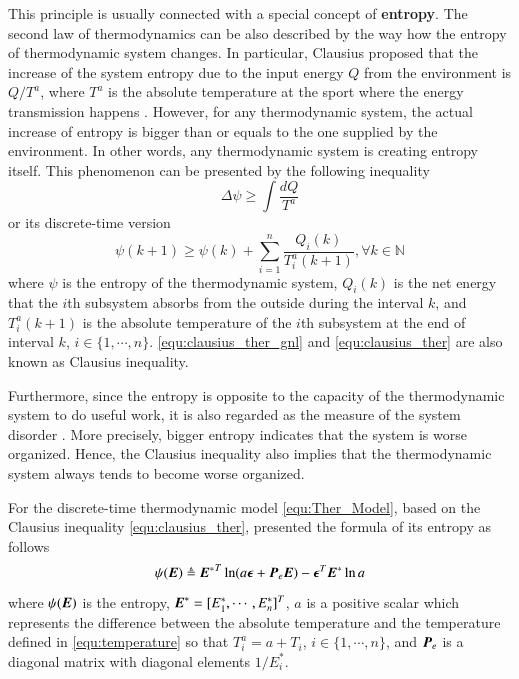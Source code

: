 \documentclass[preprint,authoryear,12pt]{elsarticle}
\renewcommand{\vec}[1]{\mbox{\boldmath$#1$}}
\newcommand{\mat}[1]{\mbox{\boldmath$#1$}}
\begin{document}
This principle is usually connected with a special concept of \textbf{entropy}. The second law of thermodynamics can be also described by the way how the entropy of thermodynamic system changes.
In particular, Clausius proposed that the increase of the system entropy due to the input energy $Q$ from the environment is $Q/T^a$, where $T^a$ is the absolute temperature at the sport where the energy transmission happens \citep{clausius_mechanical_1867}. However, for any thermodynamic system, the actual increase of entropy is bigger than or equals to the one supplied by the environment. In other words, any thermodynamic system is creating entropy itself. This phenomenon can be presented by the following inequality
\begin{equation}\label{equ:clausius_ther_gnl}
\Delta \psi \ge \int\frac{dQ}{T^a}
\end{equation}
or its discrete-time version \citep{haddad_thermodynamic_2005}
\begin{equation}\label{equ:clausius_ther}
\psi(k+1) \ge \psi(k)+\sum_{i=1}^{n}\frac{Q_i(k)}{T^a_i(k+1)},
\forall k\in\mathbb{N}
\end{equation}
where $\psi$ is the entropy of the thermodynamic system, $Q_i(k)$ is the net energy that the $i$th subsystem absorbs from the outside during the interval $k$, and $T^a_i(k+1)$ is the absolute temperature of the $i$th subsystem at the end of interval $k$, $i\in\{1,\cdots,n\}$. \eqref{equ:clausius_ther_gnl} and \eqref{equ:clausius_ther} are also known as Clausius inequality.

 Furthermore, since the entropy is opposite to the capacity of the thermodynamic system to do useful work, it is also regarded as the measure of the system disorder \citep{balmakov_entropy_2001}. More precisely, bigger entropy indicates that the system is worse organized. Hence, the Clausius inequality also implies that the thermodynamic system always tends to become worse organized.

For the discrete-time thermodynamic model \eqref{equ:Ther_Model}, based on the Clausius inequality \eqref{equ:clausius_ther}, \citet{haddad_thermodynamic_2005} presented the formula of its entropy as follows
\begin{equation}
\psi(\vec{E}) \triangleq{\vec{E}^*}^T \ln
(a\vec{\epsilon}+\mat{P}_e\vec{E}) -\vec{\epsilon}^T\vec{E}^*\ln a
\label{equ:Ther_entropy}
\end{equation}
where $\psi(\vec{E})$ is the entropy, $\vec{E}^*=[E^*_1,\cdots,E^*_n]^T$, $a$ is a positive scalar which represents the difference between the absolute temperature and the temperature defined in \eqref{equ:temperature} so that $T^a_i=a+T_i$, $i\in\{1,\cdots,n\}$, and $\mat{P}_e$ is a diagonal matrix with diagonal elements $1/E^*_i$.
\end{document}
